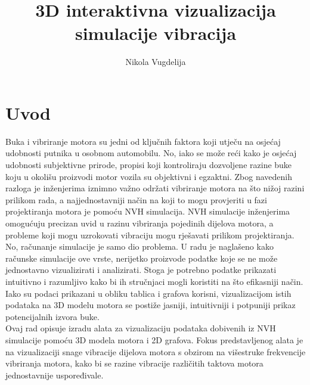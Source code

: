 \documentclass[times, utf8, diplomski]{fer}
\begin{document}

\title{3D interaktivna vizualizacija simulacije vibracija}

\author{Nikola Vugdelija}

\maketitle





\tableofcontents

\listoffigures

\chapter{Uvod}
Buka i vibriranje motora su jedni od ključnih faktora koji utječu na osjećaj udobnosti putnika u osobnom automobilu. No, iako se može reći kako je osjećaj udobnosti subjektivne prirode, propisi koji kontroliraju dozvoljene razine buke koju u okolišu proizvodi motor vozila su objektivni i egzaktni. Zbog navedenih razloga je inženjerima iznimno važno održati vibriranje motora na što nižoj razini prilikom rada, a najjednostavniji način na koji to mogu provjeriti u fazi projektiranja motora je pomoću NVH  simulacija. NVH simulacije inženjerima omogućuju precizan uvid u razinu vibriranja pojedinih dijelova motora, a probleme koji mogu uzrokovati vibraciju mogu rješavati prilikom projektiranja.\\

No, računanje simulacije je samo dio problema. U radu \citep{matkovic2021getting} je naglašeno kako računske simulacije ove vrste, nerijetko proizvode podatke koje se ne može jednostavno vizualizirati i analizirati. Stoga je potrebno podatke prikazati intuitivno i razumljivo kako bi ih stručnjaci mogli koristiti na što efikasniji način. Iako su podaci prikazani u obliku tablica i grafova korisni, vizualizacijom istih podataka na 3D modelu motora se postiže jasniji, intuitivniji i potpuniji prikaz potencijalnih izvora buke.\\

Ovaj rad opisuje izradu alata za vizualizaciju podataka dobivenih iz NVH simulacije pomoću 3D modela motora i 2D grafova. Fokus predstavljenog alata je na vizualizaciji snage vibracije dijelova motora s obzirom na višestruke frekvencije vibriranja motora, kako bi se razine vibracije različitih taktova motora jednostavnije uspoređivale.
\end{document}

